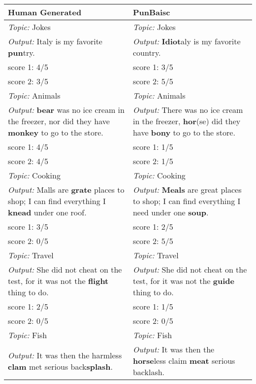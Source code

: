 \documentclass[11pt,letterpaper]{article}
\begin{document}
\begin{table}
  \centering
  \begin{tabular}{|P{7cm}|P{7cm}|}
    \hline
    Human Generated         & PunBaisc              \\ \hline
    \textit{Topic:} Jokes   & \textit{Topic:} Jokes \\
    \textit{Output:} Italy is my favorite \textbf{pun}try. & \textit{Output:} \textbf{Idiot}aly is my favorite country. \\
    score 1: 4/5            & score 1: 3/5\\
    score 2: 3/5            & score 2: 5/5          \\ \hline
    \textit{Topic:} Animals   & \textit{Topic:} Animals \\
    \textit{Output:} \textbf{bear} was no ice cream in the freezer, nor did they have \textbf{monkey} to go to the store. & \textit{Output:} There was no ice cream in the freezer, \textbf{hor}(se) did they have \textbf{bony} to go to the store. \\
    score 1: 4/5            & score 1: 1/5\\
    score 2: 4/5            & score 2: 1/5          \\ \hline
    \textit{Topic:} Cooking   & \textit{Topic:} Cooking \\
    \textit{Output:} Malls are \textbf{grate} places to shop; I can find everything I \textbf{knead} under one roof. & \textit{Output:} \textbf{Meals} are great places to shop; I can find everything I need under one \textbf{soup}. \\
    score 1: 3/5            & score 1: 2/5\\
    score 2: 0/5            & score 2: 5/5          \\ \hline
    \textit{Topic:} Travel   & \textit{Topic:} Travel \\
    \textit{Output:} She did not cheat on the test, for it was not the \textbf{flight} thing to do. & \textit{Output:} She did not cheat on the test, for it was not the \textbf{guide} thing to do. \\
    score 1: 2/5            & score 1: 1/5\\
    score 2: 0/5            & score 2: 0/5          \\ \hline
    \textit{Topic:} Fish  & \textit{Topic:} Fish \\
    \textit{Output:} It was then the harmless \textbf{clam} met serious back\textbf{splash}. & \textit{Output:} It was then the \textbf{horse}less claim \textbf{meat} serious backlash. \\

\end{tabular}
\end{table}
\end{document}
